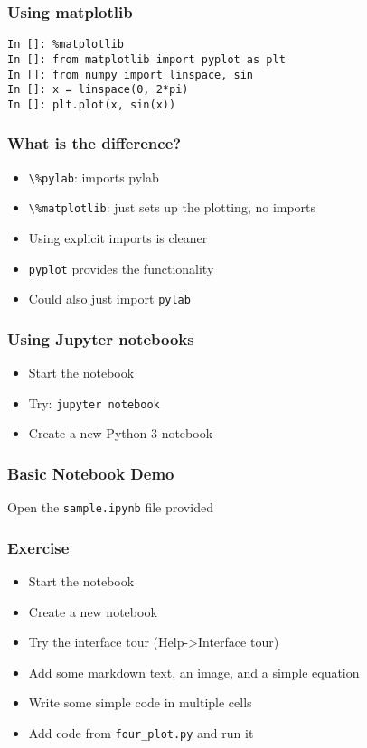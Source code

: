\documentclass[14pt,compress]{beamer}
\newcommand{\typ}[1]{\lstinline{#1}}
\begin{document}
\begin{frame}[fragile]
  \frametitle{Using matplotlib}
  \small
  \begin{lstlisting}
In []: %matplotlib
In []: from matplotlib import pyplot as plt
In []: from numpy import linspace, sin
In []: x = linspace(0, 2*pi)
In []: plt.plot(x, sin(x))
  \end{lstlisting}
\end{frame}

\begin{frame}[fragile]
  \frametitle{What is the difference?}
  \begin{itemize}
  \item \typ{\%pylab}: imports pylab
  \item \typ{\%matplotlib}: just sets up the plotting, no imports
  \item Using explicit imports is cleaner
  \item \typ{pyplot} provides the functionality
  \item Could also just import \typ{pylab}
  \end{itemize}
\end{frame}

\begin{frame}[fragile]
  \frametitle{Using Jupyter notebooks}

  \begin{itemize}
  \item Start the notebook
  \item Try:
    \typ{jupyter notebook}
  \item Create a new Python 3 notebook
  \end{itemize}
\end{frame}

\begin{frame}
  \frametitle{Basic Notebook Demo}
  \begin{center}
    Open the \typ{sample.ipynb} file provided
  \end{center}
\end{frame}

\begin{frame}
  \frametitle{Exercise}
  \begin{itemize}
  \item Start the notebook
  \item Create a new notebook
  \item Try the interface tour (Help->Interface tour)
  \item Add some markdown text, an image, and a simple equation
  \item Write some simple code in multiple cells
  \item Add code from \typ{four_plot.py} and run it
  \end{itemize}
\end{frame}
\end{document}
